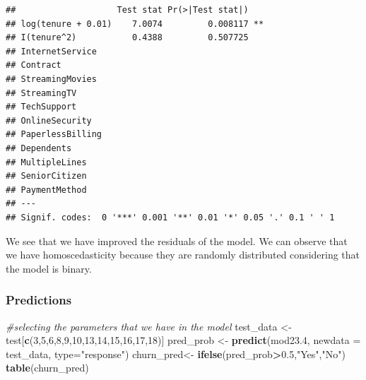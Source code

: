 \documentclass[
  twoside]{article}
\newenvironment{Shaded}{\begin{snugshade}}{\end{snugshade}}
\newcommand{\AttributeTok}[1]{\textcolor[rgb]{0.13,0.29,0.53}{#1}}
\newcommand{\CommentTok}[1]{\textcolor[rgb]{0.56,0.35,0.01}{\textit{#1}}}
\newcommand{\DecValTok}[1]{\textcolor[rgb]{0.00,0.00,0.81}{#1}}
\newcommand{\FloatTok}[1]{\textcolor[rgb]{0.00,0.00,0.81}{#1}}
\newcommand{\FunctionTok}[1]{\textcolor[rgb]{0.13,0.29,0.53}{\textbf{#1}}}
\newcommand{\NormalTok}[1]{#1}
\newcommand{\OtherTok}[1]{\textcolor[rgb]{0.56,0.35,0.01}{#1}}
\newcommand{\SpecialCharTok}[1]{\textcolor[rgb]{0.81,0.36,0.00}{\textbf{#1}}}
\newcommand{\StringTok}[1]{\textcolor[rgb]{0.31,0.60,0.02}{#1}}
\begin{document}
\begin{verbatim}
##                    Test stat Pr(>|Test stat|)   
## log(tenure + 0.01)    7.0074         0.008117 **
## I(tenure^2)           0.4388         0.507725   
## InternetService                                 
## Contract                                        
## StreamingMovies                                 
## StreamingTV                                     
## TechSupport                                     
## OnlineSecurity                                  
## PaperlessBilling                                
## Dependents                                      
## MultipleLines                                   
## SeniorCitizen                                   
## PaymentMethod                                   
## ---
## Signif. codes:  0 '***' 0.001 '**' 0.01 '*' 0.05 '.' 0.1 ' ' 1
\end{verbatim}

We see that we have improved the residuals of the model. We can observe
that we have homoscedasticity because they are randomly distributed
considering that the model is binary.

\hypertarget{predictions}{%
\subsubsection{Predictions}\label{predictions}}

\begin{Shaded}
\begin{Highlighting}[]
\CommentTok{\#selecting the parameters that we have in the model}
\NormalTok{test\_data }\OtherTok{\textless{}{-}}\NormalTok{ test[}\FunctionTok{c}\NormalTok{(}\DecValTok{3}\NormalTok{,}\DecValTok{5}\NormalTok{,}\DecValTok{6}\NormalTok{,}\DecValTok{8}\NormalTok{,}\DecValTok{9}\NormalTok{,}\DecValTok{10}\NormalTok{,}\DecValTok{13}\NormalTok{,}\DecValTok{14}\NormalTok{,}\DecValTok{15}\NormalTok{,}\DecValTok{16}\NormalTok{,}\DecValTok{17}\NormalTok{,}\DecValTok{18}\NormalTok{)]}
\NormalTok{pred\_prob }\OtherTok{\textless{}{-}} \FunctionTok{predict}\NormalTok{(mod23}\FloatTok{.4}\NormalTok{, }\AttributeTok{newdata =}\NormalTok{ test\_data, }\AttributeTok{type=}\StringTok{"response"}\NormalTok{)}
\NormalTok{churn\_pred}\OtherTok{\textless{}{-}} \FunctionTok{ifelse}\NormalTok{(pred\_prob}\SpecialCharTok{\textgreater{}}\FloatTok{0.5}\NormalTok{,}\StringTok{"Yes"}\NormalTok{,}\StringTok{"No"}\NormalTok{)}
\FunctionTok{table}\NormalTok{(churn\_pred)}
\end{Highlighting}
\end{Shaded}
\end{document}

